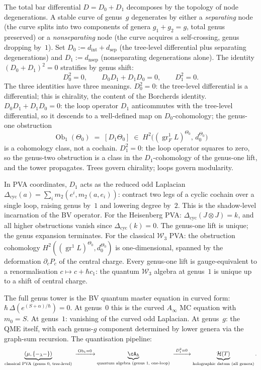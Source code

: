 The total bar differential $D=D_0+D_1$ decomposes by the topology
of node degenerations. A stable curve of genus~$g$ degenerates by
either a \emph{separating} node (the curve splits into two
components of genera $g_1+g_2=g$, total genus preserved) or a
\emph{nonseparating} node (the curve acquires a self-crossing,
genus dropping by~$1$). Set $D_0:=d_{\mathrm{int}}+d_{\mathrm{sep}}$
(the tree-level differential plus separating degenerations) and
$D_1:=d_{\mathrm{nsep}}$ (nonseparating degenerations alone). The
identity $(D_0+D_1)^2=0$ stratifies by genus shift:
\[
D_0^2=0,
\qquad
D_0 D_1+D_1 D_0=0,
\qquad
D_1^2=0.
\]
The three identities have three meanings. $D_0^2=0$: the tree-level
differential is a differential; this is chirality, the content of the
Borcherds identity. $D_0 D_1+D_1 D_0=0$: the loop operator $D_1$
anticommutes with the tree-level differential, so it descends to a
well-defined map on $D_0$-cohomology; the genus-one obstruction
\[
\operatorname{Ob}_1(\Theta_0)
\;=\;
[D_1\Theta_0]
\;\in\;
H^2\!\bigl((\operatorname{gr}^1_F L)^{\Theta_0},\,d_0^{\Theta_0}\bigr)
\]
is a cohomology class, not a cochain. $D_1^2=0$: the loop
operator squares to zero, so the genus-two obstruction is a
class in the $D_1$-cohomology of the genus-one lift, and the
tower propagates. Trees govern chirality; loops govern
modularity.

In PVA coordinates, $D_1$ acts as the reduced odd Laplacian
$\Delta_{\mathrm{cyc}}(a)=\sum_i m_2(e^i,m_2(a,e_i))$: contract
two legs of a cyclic cochain over a single loop, raising genus
by~$1$ and lowering degree by~$2$. This is the shadow-level
incarnation of the BV operator. For the Heisenberg PVA:
$\Delta_{\mathrm{cyc}}(J\otimes J)=k$, and all higher
obstructions vanish since $\Delta_{\mathrm{cyc}}(k)=0$. The
genus-one lift is unique; the genus expansion terminates. For
the classical $\mathcal W_3$ PVA: the obstruction cohomology
$H^2((\operatorname{gr}^1 L)^{\Theta_0},d_0^{\Theta_0})$ is
one-dimensional, spanned by the deformation
$\partial_c P_c$ of the central charge. Every genus-one lift
is gauge-equivalent to a renormalisation
$c\mapsto c+\hbar c_1$: the quantum $\mathcal W_3$ algebra at
genus~$1$ is unique up to a shift of central charge.

The full genus tower is the BV quantum master equation in
curved form:
$\hbar\,\Delta(e^{(S+\alpha)/\hbar})=0$.
At genus~$0$ this is the curved $A_\infty$ MC equation with
$m_0=S$. At genus~$1$: vanishing of the curved odd Laplacian.
At genus~$g$: the QME itself, with each genus-$g$ component
determined by lower genera via the graph-sum recursion. The
quantisation pipeline:
\[
\underbrace{(\mu,\{-_\lambda-\})}_{\text{classical PVA
(genus $0$, tree-level)}}
\;\xrightarrow{\;\operatorname{Ob}_1=0\;}
\underbrace{\cA_\hbar}_{\text{quantum algebra
(genus $1$, one-loop)}}
\;\xrightarrow{\;D_1^2=0\;}
\underbrace{\mathcal H(T)}_{\text{holographic datum
(all genera)}}.
\]

